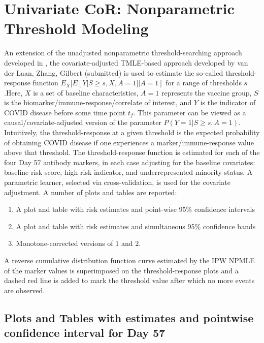 \documentclass[]{book}
\theoremstyle{definition}
\theoremstyle{definition}
\theoremstyle{definition}
\newcommand{\1}{\mathbbm{1}}
\begin{document}
\hypertarget{cor-threshold}{%
\chapter{Univariate CoR: Nonparametric Threshold Modeling}\label{cor-threshold}}

An extension of the unadjusted nonparametric threshold-searching approach
developed in \citet{Donovan}, the covariate-adjusted TMLE-based approach developed by
van der Laan, Zhang, Gilbert (submitted) is used to estimate the so-called
threshold-response function \(E_X[ E[Y|S \geq s, X, A = 1]|A=1]\) for a range of
thresholds \(s\).Here, \(X\) is a set of baseline characteristics, \(A=1\) represents
the vaccine group, \(S\) is the biomarker/immune-response/correlate of interest,
and \(Y\) is the indicator of COVID disease before some time point \(t_f\). This
parameter can be viewed as a causal/covariate-adjusted version of the parameter \(P(Y=1|S \geq s, A=1)\). Intuitively, the threshold-response at a given threshold is the expected
probability of obtaining COVID disease if one experiences a
marker/immune-response value above that threshold. The threshold-response
function is estimated for each of the four Day 57 antibody markers, in each case
adjusting for the baseline covariates: baseline risk score, high risk
indicator, and underrepresented minority status. A parametric learner, selected
via cross-validation, is used for the covariate adjustment. A number of plots
and tables are reported:

\begin{enumerate}
\item A plot and table with risk estimates and point-wise 95\% confidence intervals
\item A plot and table with risk estimates and simultaneous 95\% confidence bands
\item Monotone-corrected versions of 1 and 2.
\end{enumerate}

A reverse cumulative distribution function curve estimated by the IPW NPMLE of
the marker values is superimposed on the threshold-response plots and a dashed
red line is added to mark the threshold value after which no more events are
observed.

\clearpage

\hypertarget{plots-and-tables-with-estimates-and-pointwise-confidence-interval-for-day-57}{%
\section{Plots and Tables with estimates and pointwise confidence interval for Day 57}\label{plots-and-tables-with-estimates-and-pointwise-confidence-interval-for-day-57}}
\end{document}
